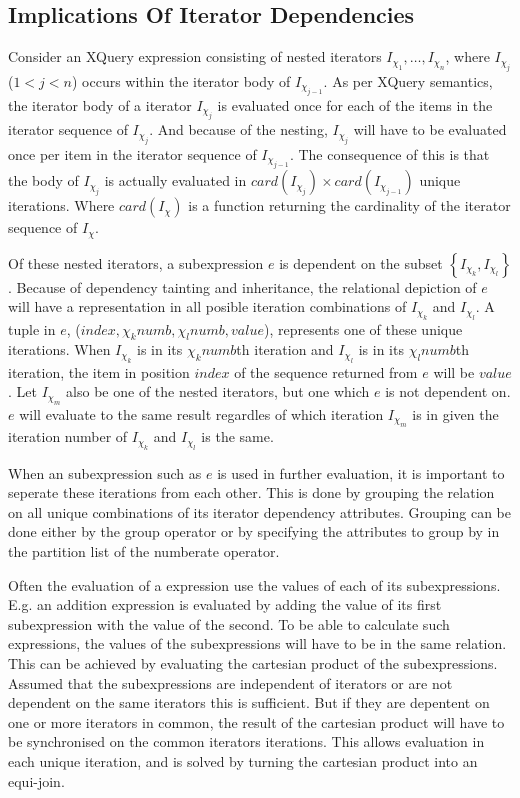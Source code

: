 \subsection{Implications Of Iterator Dependencies}
\label{sect:trans:TD:implic}
Consider an XQuery expression consisting of nested iterators $I_{\chi_1},\ldots,I_{\chi_n}$, where $I_{\chi_j}$
($1<j<n$) occurs within the iterator body of $I_{\chi_{j-1}}$. As per XQuery semantics, the iterator body of a
iterator $I_{\chi_j}$ is evaluated once for each of the items in the iterator sequence of $I_{\chi_j}$. And because
of the nesting, $I_{\chi_j}$ will have to be evaluated once per item in the iterator sequence of $I_{\chi_{j-1}}$.
The consequence of this is that the body of $I_{\chi_j}$ is actually evaluated in $card(I_{\chi_j}) \times
card(I_{\chi_{j-1}})$ unique iterations. Where $card(I_{\chi})$ is a function returning the cardinality of the
iterator sequence of $I_{\chi}$.

Of these nested iterators, a subexpression $e$ is dependent on the subset
$\left\{I_{\chi_k},I_{\chi_l}\right\}$. Because of dependency tainting and inheritance, the relational
depiction of $e$ will have a representation in all posible iteration combinations of $I_{\chi_k}$ and
$I_{\chi_l}$. A tuple in $e$, ($index, \chi_k{numb},\chi_l{numb}, value$), represents one of these unique
iterations. When $I_{\chi_k}$ is in its $\chi_k{numb}$th iteration and $I_{\chi_l}$ is in its $\chi_l{numb}$th
iteration, the item in position $index$ of the sequence returned from $e$ will be $value$. Let $I_{\chi_m}$ also
be one of the nested iterators, but one which $e$ is not dependent on. $e$ will evaluate to the same result
regardles of which iteration $I_{\chi_m}$ is in given the iteration number of $I_{\chi_k}$ and $I_{\chi_l}$ is the
same.

When an subexpression such as $e$ is used in further evaluation, it is important to seperate these iterations from
each other. This is done by grouping the relation on all unique combinations of its iterator dependency attributes.
Grouping can be done either by the \textsf{group} operator or by specifying the attributes to group by in the
partition list of the \textsf{numberate} operator.

Often the evaluation of a expression use the values of each of its subexpressions. E.g. an addition expression is
evaluated by adding the value of its first subexpression with the value of the second. To be able to calculate
such expressions, the values of the subexpressions will have to be in the same relation. This can be achieved by
evaluating the cartesian product of the subexpressions. Assumed that the subexpressions are independent of
iterators or are not dependent on the same iterators this is sufficient. But if they are depentent on one or more
iterators in common, the result of the cartesian product will have to be synchronised on the common iterators
iterations. This allows evaluation in each unique iteration, and is solved by turning the cartesian product into
an equi-join.

